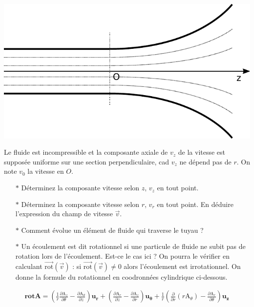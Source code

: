 \documentclass{report}
\begin{document}
\begin{center}
	\includegraphics[scale=0.5]{meca_flu1.pdf}
\end{center}

Le fluide est incompressible et la composante axiale de $v_z$ de la vitesse est supposée uniforme sur une section perpendiculaire, cad $v_z$ ne dépend pas de $r$. On note $v_0$ la vitesse en $O$.

\begin{itemize}
	\item[$\ast$] Déterminez la composante vitesse selon $z$, $v_z$ en tout point. 
	\item[$\ast$] Déterminez la composante vitesse selon $r$, $v_r$ en tout point. En déduire l'expression du champ de vitesse $\vec{v}$.
	\item[$\ast$] Comment évolue un élément de fluide qui traverse le tuyau ? 
	\item[$\ast$] Un écoulement est dit rotationnel si une particule de fluide ne subit pas de rotation lors de l'écoulement. Est-ce le cas ici ? On pourra le vérifier en calculant $\mathrm{\vec{rot}} (\vec{v})$ : si $\mathrm{\vec{rot}} (\vec{v})\neq0$ alors l'écoulement est irrotationnel. On donne la formule du rotationnel en coodronnées cylindrique ci-dessous.
	
\end{itemize}

\begin{align*}
	\mathbf{rot} \mathbf{A}
   = \left(\frac{1}{r}\frac{\partial \mathrm{A}_z}{\partial \theta} - \frac{\partial \mathrm{A}_\theta}{\partial z}\right) \mathbf{u_r}
   + \left(\frac{\partial \mathrm{A}_r}{\partial z} - \frac{\partial \mathrm{A}_z}{\partial r}\right)\mathbf{u_\theta}
   + \frac{1}{r}\left(\frac{\partial}{\partial r}(r \mathrm{A}_\theta) - \frac{\partial \mathrm{A}_r}{\partial \theta}\right) \mathbf{u_z}
\end{align*}
\end{document}

